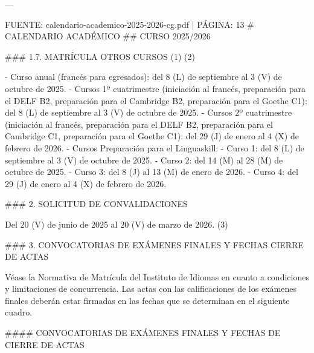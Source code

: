 \documentclass{article}
\begin{document}
\begin{itemize}
\begin{itemize}
\begin{scriptsize}
                  ---

                  FUENTE: calendario-academico-2025-2026-cg.pdf | PÁGINA: 13
                  \# CALENDARIO ACADÉMICO
                  \#\# CURSO 2025/2026

                  \#\#\# 1.7. MATRÍCULA OTROS CURSOS (1) (2)

                  - Curso anual (francés para egresados): del 8 (L) de septiembre al 3 (V) de octubre de 2025.
                  - Cursos 1º cuatrimestre (iniciación al francés, preparación para el DELF B2, preparación para el Cambridge B2, preparación para el Goethe C1): del 8 (L) de septiembre al 3 (V) de octubre de 2025.
                  - Cursos 2º cuatrimestre (iniciación al francés, preparación para el DELF B2, preparación para el Cambridge C1, preparación para el Goethe C1): del 29 (J) de enero al 4 (X) de febrero de 2026.
                  - Cursos Preparación para el Linguaskill:
                  - Curso 1: del 8 (L) de septiembre al 3 (V) de octubre de 2025.
                  - Curso 2: del 14 (M) al 28 (M) de octubre de 2025.
                  - Curso 3: del 8 (J) al 13 (M) de enero de 2026.
                  - Curso 4: del 29 (J) de enero al 4 (X) de febrero de 2026.

                  \#\#\# 2. SOLICITUD DE CONVALIDACIONES

                  Del 20 (V) de junio de 2025 al 20 (V) de marzo de 2026. (3)

                  \#\#\# 3. CONVOCATORIAS DE EXÁMENES FINALES Y FECHAS CIERRE DE ACTAS

                  Véase la Normativa de Matrícula del Instituto de Idiomas en cuanto a condiciones y limitaciones de concurrencia. Las actas con las calificaciones de los exámenes finales deberán estar firmadas en las fechas que se determinan en el siguiente cuadro.

                  \#\#\#\# CONVOCATORIAS DE EXÁMENES FINALES Y FECHAS DE CIERRE DE ACTAS


\end{scriptsize}
\end{itemize}
\end{itemize}
\end{document}
